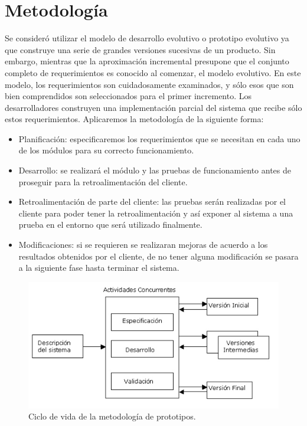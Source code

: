 \section{Metodología}

Se consideró utilizar el modelo de desarrollo evolutivo o prototipo evolutivo ya que construye una serie de grandes versiones
sucesivas de un producto. Sin embargo, mientras que la aproximación incremental presupone que el conjunto completo de
requerimientos es conocido al comenzar, el modelo evolutivo. En este modelo, los requerimientos son cuidadosamente
examinados, y sólo esos que son bien comprendidos son seleccionados para el primer incremento. Los desarrolladores construyen
una implementación parcial del sistema que recibe sólo estos requerimientos.
Aplicaremos la metodología de la siguiente forma:\\

\begin{itemize}
	\item Planificación: especificaremos los requerimientos que se necesitan en cada uno de los módulos para su correcto
funcionamiento.

	\item Desarrollo: se realizará el módulo y las pruebas de funcionamiento antes de proseguir para la retroalimentación del cliente.
	
	\item Retroalimentación de parte del cliente: las pruebas serán realizadas por el cliente para poder tener la retroalimentación y
así exponer al sistema a una prueba en el entorno que será utilizado finalmente.
	
	\item Modificaciones: si se requieren se realizaran mejoras de acuerdo a los resultados obtenidos por el cliente, de no tener
alguna modificación se pasara a la siguiente fase hasta terminar el sistema.\\

\end{itemize}


\begin{figure}
	\centering
	\includegraphics[scale=.7]{images/metodologia}
	\caption{Ciclo de vida de la metodología de prototipos.}
	\label{fig:metodologia}
\end{figure}


